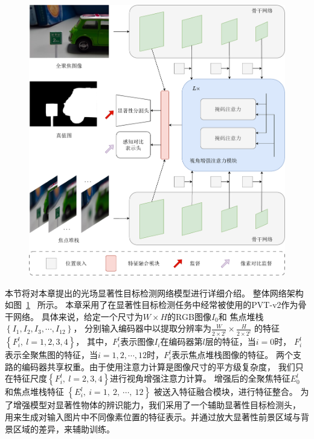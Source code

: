 \begin{figure}[!ht]
	\centering
	\includegraphics[width=0.95\linewidth]{figures/chapter4/chpt4_overview}
	\label{cpt4_fig1:chpt4_overview}
\end{figure}
%
%
%
%
%
本节将对本章提出的光场显著性目标检测网络模型进行详细介绍。
整体网络架构如图~\ref{cpt4_fig1:chpt4_overview}
~所示。
本章采用了在显著性目标检测任务中经常被使用的PVT-v2作为骨干网络。
具体来说，给定一个尺寸为$W \times H$的RGB图像$I_{0}$和
焦点堆栈$\left \{  I_{1},I_{2},I_{3},\cdots,I_{12} \right \} $，
分别输入编码器中以提取分辨率为$\frac{W}{2 \times 2^{l}} \times \frac{H}{2  \times 2^{l}} $ 
的特征$\left \{ F_{i}^{l},~l=1,2,3,4 \right \}$，
其中，$F_{i}^{l}$表示图像$I_{i}$在编码器第$l$层的特征，当$i=0$时，
$F_{i}^{l}$表示全聚焦图的特征，当$i=1,2,\cdots,12$时，$F_{i}^{l}$表示焦点堆栈图像的特征。
两个支路的编码器共享权重。由于使用注意力计算是图像尺寸的平方级复杂度，
我们只在特征尺度$\left \{ F_{i}^{l},~ l = 2, 3, 4\right \}$进行视角增强注意力计算。
增强后的全聚焦特征$ E_{0}^{l} $ 和焦点堆栈特征 $\left \{ E_{i}^{l},~i=1,~2,~ \cdots,~12 \right \}$
被送入特征融合模块，进行特征整合。
为了增强模型对显著性物体的辨识能力，我们采用了一个辅助显著性目标检测头，
用来生成对输入图片中不同像素位置的特征表示。并通过放大显著性前景区域与背景区域的差异，来辅助训练。
